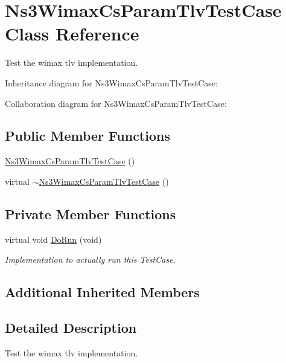 \hypertarget{classNs3WimaxCsParamTlvTestCase}{}\section{Ns3\+Wimax\+Cs\+Param\+Tlv\+Test\+Case Class Reference}
\label{classNs3WimaxCsParamTlvTestCase}


Test the wimax tlv implementation.  




Inheritance diagram for Ns3\+Wimax\+Cs\+Param\+Tlv\+Test\+Case\+:


Collaboration diagram for Ns3\+Wimax\+Cs\+Param\+Tlv\+Test\+Case\+:
\subsection*{Public Member Functions}
\begin{DoxyCompactItemize}
\item 
\hyperlink{classNs3WimaxCsParamTlvTestCase_a2a944715cd93c55af7f4f81d427429aa}{Ns3\+Wimax\+Cs\+Param\+Tlv\+Test\+Case} ()
\item 
virtual \hyperlink{classNs3WimaxCsParamTlvTestCase_a242db6e2bdaee823f2b6eba0ea492660}{$\sim$\+Ns3\+Wimax\+Cs\+Param\+Tlv\+Test\+Case} ()
\end{DoxyCompactItemize}
\subsection*{Private Member Functions}
\begin{DoxyCompactItemize}
\item 
virtual void \hyperlink{classNs3WimaxCsParamTlvTestCase_a787e5b86252dac18778c864535b1d4d4}{Do\+Run} (void)
\begin{DoxyCompactList}\small\item\em Implementation to actually run this Test\+Case. \end{DoxyCompactList}\end{DoxyCompactItemize}
\subsection*{Additional Inherited Members}


\subsection{Detailed Description}
Test the wimax tlv implementation. 

